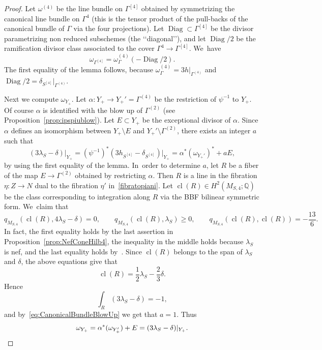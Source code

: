 \documentclass[JEP,XML,SOM,Unicode,published]{cedram}
\newcommand{\QQ}{{\mathbb Q}}\let\Q\QQ
\DeclareMathOperator{\cl}{cl}
\DeclareMathOperator{\Diag}{Diag}
\theoremstyle{definition}
\begin{document}
\begin{proof}
Let $\omega^{(4)}$ be the line bundle on $\mathsf{\Gamma}^{[4]}$ obtained by symmetrizing the canonical line bundle on $\mathsf{\Gamma}^4$ (this is the tensor product of the pull-backs of the canonical bundle of $\mathsf{\Gamma}$ via the four projections). Let $\Diag\subset \mathsf{\Gamma}^{[4]}$ be the divisor parametrizing non reduced subschemes (the \lq\lq diagonal\rq\rq), and let $\Diag/2$ be the ramification divisor class associated to the cover $\mathsf{\Gamma}^4\to \mathsf{\Gamma}^{[4]}$. We~have
\[
\omega_{\mathsf{\Gamma}^{[4]}}=\omega^{(4)}_{\mathsf{\Gamma}}(-\Diag/2).
\]
The first equality of the lemma follows, because $\omega^{(4)}_{\mathsf{\Gamma}}=3 h \vert_{\mathsf{\Gamma}^{(4)}}$ and $\Diag/2=\delta_{S^{[4]}}\vert_{\mathsf{\Gamma}^{(4)}}$.

Next we compute $\omega_{Y_+}$. Let $\alpha\colon Y_{+}\to Y_{+}'=\mathsf{\Gamma}^{(4)}$ be the restriction of $\psi^{-1}$ to $Y_{+}$. Of course $\alpha$ is identified with the blow up of $\mathsf{\Gamma}^{(2)}$ (see Proposition~\ref{prop:ipspiublow}).
Let $E\subset Y_+$ be the exceptional divisor of $\alpha$.
Since $\alpha$ defines an isomorphism between $Y_{+}\setminus E$ and $Y_{+}'\setminus \mathsf{\Gamma}^{(2)}$, there exists an integer $a$ such that
\begin{equation}\label{eq:CanonicalBundleBlowUp}
(3 \lambda_S - \delta)\vert_{Y_+} = (\psi^{-1})^{*}(3 h_{S^{[4]}} - \delta_{S^{[4]}})\vert_{Y_+} = \alpha^{*}(\omega_{Y_{+}'})^*+ a E,
\end{equation}
by using the first equality of the lemma. In~order to determine $a$, let $R$ be a fiber of the map $E\to \mathsf{\Gamma}^{(2)}$ obtained by restricting $\alpha$. Then $R$ is a line in the fibration $\eta\colon Z\to N$ dual to the fibration $\eta'$ in~\eqref{fibratopiani}. Let $\cl(R)\in H^2(M_{S,4};\QQ)$ be the class corresponding to integration along $R$ via the BBF bilinear symmetric form. We~claim that
\begin{equation*}
q_{M_{S,4}}\left(\cl(R),4\lambda_S-\delta\right)=0,\qquad
q_{M_{S,4}}\left(\cl(R),\lambda_S\right)\ge 0,\qquad
q_{M_{S,4}}\left(\cl(R),\cl(R)\right)=-\frac{13}{6}.
\end{equation*}
In fact, the first equality holds by the last assertion in
Proposition~\ref{prop:NefConeHilb4}, the inequality in the middle holds because $\lambda_S$ is nef, and the last equality holds by~\cite[Table\,H4]{HT:IntersectionNumbers}.
Since $\cl(R)$ belongs to the span of $\lambda_S$ and $\delta$, the above equations give that
\[
\cl(R) = \frac 12 \lambda_S - \frac 23 \delta.
\]
Hence
\[
\int_R(3\lambda_S - \delta) = -1,
\]
and by~\eqref{eq:CanonicalBundleBlowUp} we get that $a=1$. Thus
\[
\omega_{Y_+} = \alpha^*(\omega_{Y_+'}) + E = (3 \lambda_S - \delta)\vert_{Y_+}.\qedhere
\]
\end{proof}
\end{document}
